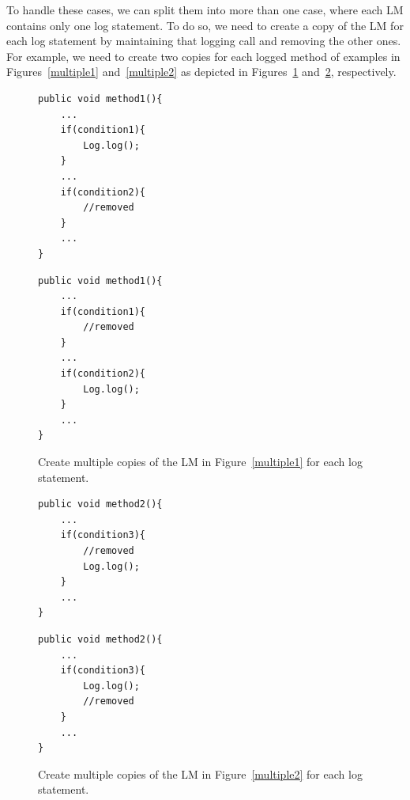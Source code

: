 To handle these cases, we can split them into more than one case, where each LM contains only one log statement. To do so, we need to create a copy of the LM for each log statement by maintaining that logging call and removing the other ones. For example, we need to create two copies for each logged  method of examples in Figures~\ref{multiple1} and~\ref{multiple2} as depicted in Figures~\ref{multiple1-one} and~\ref{multiple2-one}, respectively.


\begin{figure}[H]
\def\baselinestretch{1}
\begin{lstlisting}
public void method1(){
	...
	if(condition1){
		Log.log();
	}
	...
	if(condition2){
		//removed
	}
	...
}
\end{lstlisting}
\begin{lstlisting}
public void method1(){
	...
	if(condition1){
		//removed
	}
	...
	if(condition2){
		Log.log();
	}
	...
}

\end{lstlisting}
\caption{Create multiple copies of the LM in Figure~\ref{multiple1} for each log statement.\label{multiple1-one}}
\end{figure}



\begin{figure}[H]
\def\baselinestretch{1}
\begin{lstlisting}
public void method2(){
	...
	if(condition3){
		//removed
		Log.log();
	}
	...
}
\end{lstlisting}
\begin{lstlisting}
public void method2(){
	...
	if(condition3){
		Log.log();
		//removed
	}
	...
}

\end{lstlisting}
\caption{Create multiple copies of the LM in Figure~\ref{multiple2} for each log statement.\label{multiple2-one}}
\end{figure}

